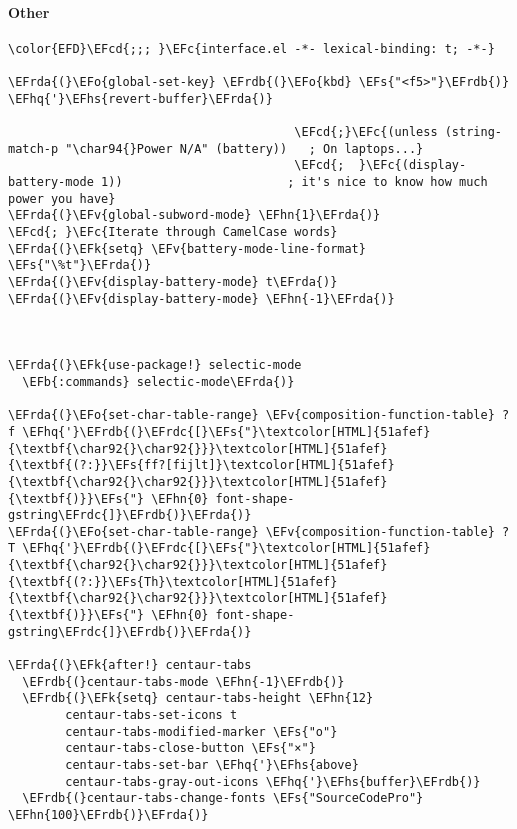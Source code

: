 \documentclass[a4wide,10pt]{article}
\newcommand{\EFc}[1]{\textcolor{EFc}{#1}} %
\newcommand{\EFcd}[1]{\textcolor{EFcd}{#1}} %
\newcommand{\EFs}[1]{\textcolor{EFs}{#1}} %
\newcommand{\EFk}[1]{\textcolor{EFk}{#1}} %
\newcommand{\EFb}[1]{\textcolor{EFb}{#1}} %
\newcommand{\EFv}[1]{\textcolor{EFv}{#1}} %
\newcommand{\EFo}[1]{\textcolor{EFo}{#1}} %
\newcommand{\EFhn}[1]{\textcolor{EFhn}{\textbf{#1}}} %
\newcommand{\EFhq}[1]{\textcolor{EFhq}{#1}} %
\newcommand{\EFhs}[1]{\textcolor{EFhs}{#1}} %
\newcommand{\EFrda}[1]{\textcolor{EFrda}{#1}} %
\newcommand{\EFrdb}[1]{\textcolor{EFrdb}{#1}} %
\newcommand{\EFrdc}[1]{\textcolor{EFrdc}{#1}} %
\begin{document}
\paragraph{Other}
\label{sec:orgcceb64d}
\begin{Code}
\begin{Verbatim}
\color{EFD}\EFcd{;;; }\EFc{interface.el -*- lexical-binding: t; -*-}

\EFrda{(}\EFo{global-set-key} \EFrdb{(}\EFo{kbd} \EFs{"<f5>"}\EFrdb{)} \EFhq{'}\EFhs{revert-buffer}\EFrda{)}

                                        \EFcd{;}\EFc{(unless (string-match-p "\char94{}Power N/A" (battery))   ; On laptops...}
                                        \EFcd{;  }\EFc{(display-battery-mode 1))                       ; it's nice to know how much power you have}
\EFrda{(}\EFv{global-subword-mode} \EFhn{1}\EFrda{)}                           \EFcd{; }\EFc{Iterate through CamelCase words}
\EFrda{(}\EFk{setq} \EFv{battery-mode-line-format} \EFs{"\%t"}\EFrda{)}
\EFrda{(}\EFv{display-battery-mode} t\EFrda{)}
\EFrda{(}\EFv{display-battery-mode} \EFhn{-1}\EFrda{)}



\EFrda{(}\EFk{use-package!} selectic-mode
  \EFb{:commands} selectic-mode\EFrda{)}

\EFrda{(}\EFo{set-char-table-range} \EFv{composition-function-table} ?f \EFhq{'}\EFrdb{(}\EFrdc{[}\EFs{"}\textcolor[HTML]{51afef}{\textbf{\char92{}\char92{}}}\textcolor[HTML]{51afef}{\textbf{(?:}}\EFs{ff?[fijlt]}\textcolor[HTML]{51afef}{\textbf{\char92{}\char92{}}}\textcolor[HTML]{51afef}{\textbf{)}}\EFs{"} \EFhn{0} font-shape-gstring\EFrdc{]}\EFrdb{)}\EFrda{)}
\EFrda{(}\EFo{set-char-table-range} \EFv{composition-function-table} ?T \EFhq{'}\EFrdb{(}\EFrdc{[}\EFs{"}\textcolor[HTML]{51afef}{\textbf{\char92{}\char92{}}}\textcolor[HTML]{51afef}{\textbf{(?:}}\EFs{Th}\textcolor[HTML]{51afef}{\textbf{\char92{}\char92{}}}\textcolor[HTML]{51afef}{\textbf{)}}\EFs{"} \EFhn{0} font-shape-gstring\EFrdc{]}\EFrdb{)}\EFrda{)}

\EFrda{(}\EFk{after!} centaur-tabs
  \EFrdb{(}centaur-tabs-mode \EFhn{-1}\EFrdb{)}
  \EFrdb{(}\EFk{setq} centaur-tabs-height \EFhn{12}
        centaur-tabs-set-icons t
        centaur-tabs-modified-marker \EFs{"o"}
        centaur-tabs-close-button \EFs{"×"}
        centaur-tabs-set-bar \EFhq{'}\EFhs{above}
        centaur-tabs-gray-out-icons \EFhq{'}\EFhs{buffer}\EFrdb{)}
  \EFrdb{(}centaur-tabs-change-fonts \EFs{"SourceCodePro"} \EFhn{100}\EFrdb{)}\EFrda{)}


\end{Verbatim}
\end{Code}
\end{document}
